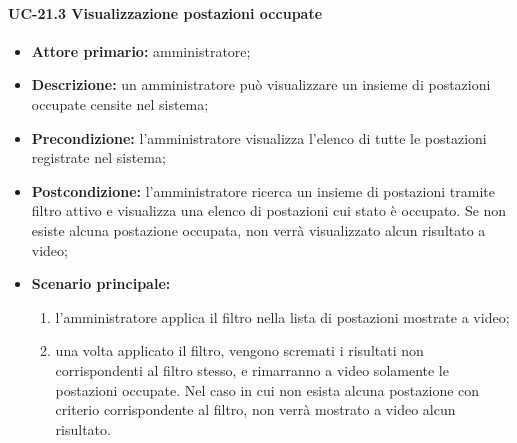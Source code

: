 \paragraph{UC-21.3 Visualizzazione postazioni occupate}
\begin{itemize}
    \item \textbf{Attore primario:} amministratore;
    \item \textbf{Descrizione:} un amministratore pu\`{o} visualizzare un insieme di postazioni occupate censite nel sistema;
    \item \textbf{Precondizione:} l'amministratore visualizza l'elenco di tutte le postazioni registrate nel sistema;
    \item \textbf{Postcondizione:} l'amministratore ricerca un insieme di postazioni tramite filtro attivo e visualizza una elenco di postazioni cui stato è occupato. Se non esiste alcuna postazione occupata, non verrà visualizzato alcun risultato a video;
    \item \textbf{Scenario principale:}
    \begin{enumerate}
        \item l'amministratore applica il filtro nella lista di postazioni mostrate a video;
        \item una volta applicato il filtro, vengono scremati i risultati non corrispondenti al filtro stesso, e rimarranno a video solamente le postazioni occupate. Nel caso in cui non esista alcuna postazione con criterio corrispondente al filtro, non verrà mostrato a video alcun risultato.
    \end{enumerate}
\end{itemize}

